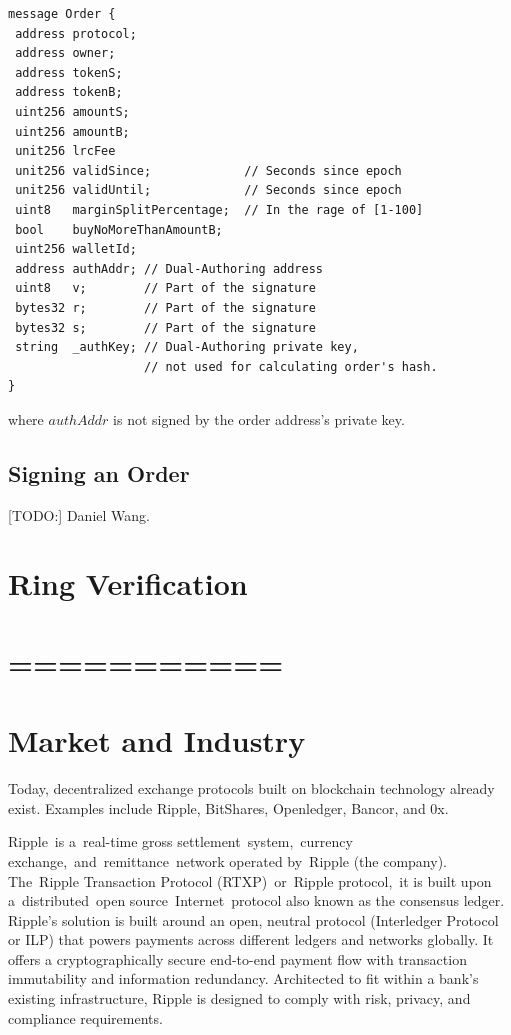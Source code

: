 \documentclass[UTF8,nofonts]{article}
\begin{document}
\begin{verbatim}
message Order {
 address protocol;
 address owner;
 address tokenS;
 address tokenB;
 uint256 amountS;
 uint256 amountB;
 unit256 lrcFee
 unit256 validSince;             // Seconds since epoch
 unit256 validUntil;             // Seconds since epoch
 uint8   marginSplitPercentage;  // In the rage of [1-100]
 bool    buyNoMoreThanAmountB;
 uint256 walletId;
 address authAddr; // Dual-Authoring address
 uint8   v;        // Part of the signature
 bytes32 r;        // Part of the signature
 bytes32 s;        // Part of the signature
 string  _authKey; // Dual-Authoring private key,
                   // not used for calculating order's hash.
}
\end{verbatim}


where $authAddr$ is not signed by the order address’s private key.

\subsection{Signing an Order}
[TODO:] Daniel Wang.

\section{Ring Verification}


\section{===========}






















\section{Market and Industry\label{sec: existingworks}}

Today, decentralized exchange protocols built on blockchain technology already exist. Examples include Ripple, BitShares, Openledger, Bancor, and 0x.

Ripple\cite{schwartz2014ripple} is a real-time gross settlement system, currency exchange, and remittance network operated by Ripple (the company). The Ripple Transaction Protocol (RTXP) or Ripple protocol, it is built upon a distributed open source Internet protocol also known as the consensus ledger. Ripple's solution is built around an open, neutral protocol (Interledger Protocol or ILP\cite{thomas2015protocol}) that powers payments across different ledgers and networks globally. It offers a cryptographically secure end-to-end payment flow with transaction immutability and information redundancy. Architected to fit within a bank's existing infrastructure, Ripple is designed to comply with risk, privacy, and compliance requirements.
\end{document}
